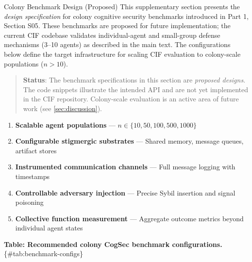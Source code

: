 \documentclass[
  ignorenonframetext,
]{beamer}
\author{\texorpdfstring{}{}}
\date{}
\providecommand{\tightlist}{%
  \setlength{\itemsep}{0pt}\setlength{\parskip}{0pt}}
\begin{document}
\begin{frame}
\newpage
\end{frame}

\begin{frame}[fragile]{Colony Benchmark Design (Proposed)}
\protect{}\label{sec:benchmark-implementation}
This supplementary section presents the \emph{design specification} for
colony cognitive security benchmarks introduced in Part 1, Section S05.
These benchmarks are proposed for future implementation; the current CIF
codebase validates individual-agent and small-group defense mechanisms
(3--10 agents) as described in the main text. The configurations below
define the target infrastructure for scaling CIF evaluation to
colony-scale populations (\(n > 10\)).

\begin{quote}
\textbf{Status}: The benchmark specifications in this section are
\emph{proposed designs}. The code snippets illustrate the intended API
and are not yet implemented in the CIF repository. Colony-scale
evaluation is an active area of future work (see \cref{sec:discussion}).
\end{quote}

\begin{enumerate}
\tightlist
\item
  \textbf{Scalable agent populations} ---
  \(n \in \{10, 50, 100, 500, 1000\}\)
\item
  \textbf{Configurable stigmergic substrates} --- Shared memory, message
  queues, artifact stores
\item
  \textbf{Instrumented communication channels} --- Full message logging
  with timestamps
\item
  \textbf{Controllable adversary injection} --- Precise Sybil insertion
  and signal poisoning
\item
  \textbf{Collective function measurement} --- Aggregate outcome metrics
  beyond individual agent states
\end{enumerate}

\textbf{Table: Recommended colony CogSec benchmark configurations.}
\{\#tab:benchmark-configs\}


\end{frame}
\end{document}
